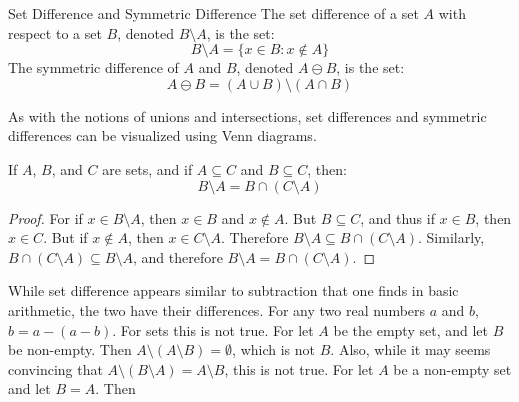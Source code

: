             \begin{ldefinition}{Set Difference and Symmetric Difference}
                The set difference of a set $A$ with respect to a set $B$,
                denoted $B\setminus{A}$, is the set:
                \begin{equation}
                    B\setminus{A}=\{x\in{B}:x\notin{A}\}
                \end{equation}
                The symmetric difference of $A$ and $B$, denoted
                $A\ominus{B}$, is the set:
                \begin{equation}
                    A\ominus{B}=(A\cup{B})\setminus(A\cap{B})
                \end{equation}
            \end{ldefinition}
            As with the notions of unions and intersections, set differences and
            symmetric differences can be visualized using Venn diagrams.
            \begin{theorem}
                \label{thm:MEASURE_THEORY_SET_DIFFERENCE_AS_INTERSECTION}
                If $A$, $B$, and $C$ are sets, and if $A\subseteq{C}$
                and $B\subseteq{C}$, then:
                \begin{equation}
                    B\setminus{A}=B\cap(C\setminus{A})
                \end{equation}
            \end{theorem}
            \begin{proof}
                For if $x\in{B}\setminus{A}$, then
                $x\in{B}$ and $x\notin{A}$. But
                $B\subseteq{C}$, and thus if $x\in{B}$, then $x\in{C}$.
                But if $x\notin{A}$, then $x\in{C}\setminus{A}$. Therefore
                $B\setminus{A}\subseteq{B}\cap(C\setminus{A})$.
                Similarly, $B\cap(C\setminus{A})\subseteq{B}\setminus{A}$,
                and therefore $B\setminus{A}={B}\cap(C\setminus{A})$.
            \end{proof}
            While set difference appears similar to subtraction that one finds in
            basic arithmetic, the two have their differences. For any two real
            numbers $a$ and $b$, $b=a-(a-b)$. For sets this is not true. For let
            $A$ be the empty set, and let $B$ be non-empty. Then
            $A\setminus(A\setminus{B})=\emptyset$, which is not $B$.
            Also, while it may seems convincing that
            $A\setminus(B\setminus{A})=A\setminus{B}$, this is not true. For
            let $A$ be a non-empty set and let $B=A$. Then
